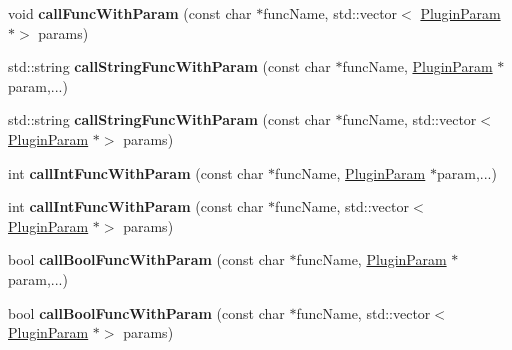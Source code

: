 \begin{DoxyCompactItemize}
\mbox{\label{classcocos2d_1_1plugin_1_1PluginProtocol_a55890b76332682e0868d95c05c515794}} 
void {\bfseries call\+Func\+With\+Param} (const char $\ast$func\+Name, std\+::vector$<$ \hyperlink{classcocos2d_1_1plugin_1_1PluginParam}{Plugin\+Param} $\ast$$>$ params)
\item 
\mbox{\label{classcocos2d_1_1plugin_1_1PluginProtocol_afc53dc7cf3751c96f89b40dfeae9b8a9}} 
std\+::string {\bfseries call\+String\+Func\+With\+Param} (const char $\ast$func\+Name, \hyperlink{classcocos2d_1_1plugin_1_1PluginParam}{Plugin\+Param} $\ast$param,...)
\item 
\mbox{\label{classcocos2d_1_1plugin_1_1PluginProtocol_acff34f8f84ef80808d9de247b2c2715c}} 
std\+::string {\bfseries call\+String\+Func\+With\+Param} (const char $\ast$func\+Name, std\+::vector$<$ \hyperlink{classcocos2d_1_1plugin_1_1PluginParam}{Plugin\+Param} $\ast$$>$ params)
\item 
\mbox{\label{classcocos2d_1_1plugin_1_1PluginProtocol_adfc5670ad192129d599894d1c1373fd7}} 
int {\bfseries call\+Int\+Func\+With\+Param} (const char $\ast$func\+Name, \hyperlink{classcocos2d_1_1plugin_1_1PluginParam}{Plugin\+Param} $\ast$param,...)
\item 
\mbox{\label{classcocos2d_1_1plugin_1_1PluginProtocol_a8af847584399f3f99726141194766986}} 
int {\bfseries call\+Int\+Func\+With\+Param} (const char $\ast$func\+Name, std\+::vector$<$ \hyperlink{classcocos2d_1_1plugin_1_1PluginParam}{Plugin\+Param} $\ast$$>$ params)
\item 
\mbox{\label{classcocos2d_1_1plugin_1_1PluginProtocol_ad248062ae064f739a4ee25681b3f0f50}} 
bool {\bfseries call\+Bool\+Func\+With\+Param} (const char $\ast$func\+Name, \hyperlink{classcocos2d_1_1plugin_1_1PluginParam}{Plugin\+Param} $\ast$param,...)
\item 
\mbox{\label{classcocos2d_1_1plugin_1_1PluginProtocol_af2ed5080772b225606042ccf99100d08}} 
bool {\bfseries call\+Bool\+Func\+With\+Param} (const char $\ast$func\+Name, std\+::vector$<$ \hyperlink{classcocos2d_1_1plugin_1_1PluginParam}{Plugin\+Param} $\ast$$>$ params)

\end{DoxyCompactItemize}
